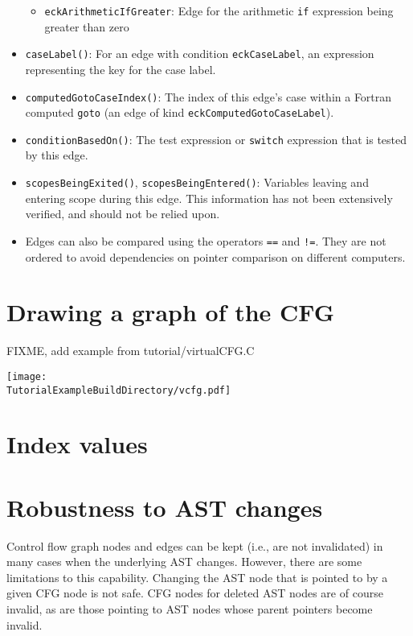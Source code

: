 \begin{itemize}
\begin{itemize}
  \item \lstinline{eckArithmeticIfGreater}: Edge for the arithmetic \lstinline{if} expression being greater than zero
  \end{itemize}
\item \lstinline{caseLabel()}: For an edge with condition
      \lstinline{eckCaseLabel}, an expression representing the key for the case
      label.
\item \lstinline{computedGotoCaseIndex()}: The index of this edge's case
      within a Fortran computed \lstinline{goto} (an edge of kind
      \lstinline{eckComputedGotoCaseLabel}).
\item \lstinline{conditionBasedOn()}: The test expression or
      \lstinline{switch} expression that is tested by this edge.
\item \lstinline{scopesBeingExited()}, \lstinline{scopesBeingEntered()}:
      Variables leaving and entering scope during this edge.  This information
      has not been extensively verified, and should not be relied upon.
\item Edges can also be compared using the operators \lstinline{==} and
      \lstinline{!=}.  They are not ordered to avoid dependencies on pointer
      comparison on different computers.
\end{itemize}

\section{Drawing a graph of the CFG}

FIXME, add example from tutorial/virtualCFG.C

\texttt{[image: \\TutorialExampleBuildDirectory/vcfg.pdf]}

\section{Index values}
\label{cfg_index_values}

\section{Robustness to AST changes}

Control flow graph nodes and edges can be kept (i.e., are not invalidated)
in many cases when the underlying AST changes.  However, there are some
limitations to this capability.  Changing the AST node that is pointed to
by a given CFG node is not safe.  CFG nodes for deleted AST nodes are of
course invalid, as are those pointing to AST nodes whose parent pointers
become invalid.

